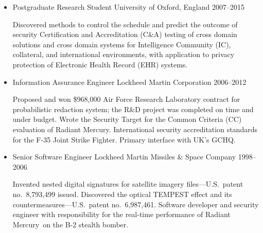 \vspace{3mm}
\begin{itemize}

    \vspace{-2mm}
	\item Postgraduate Research Student \hfill University of Oxford, England \hfill 2007--2015
        \vspace{-2mm}
		\begin{myquote}
            Discovered methods to control the schedule and predict the
            outcome of security Certification and Accreditation (C\&A)
            testing of cross domain solutions and cross domain systems for
            Intelligence Community (IC), collateral, and international
            environments, with application to privacy protection
            of Electronic Health Record (EHR) systems.
		\end{myquote}

    \vspace{-2mm}
	\item Information Assurance Engineer \hfill Lockheed Martin Corporation \hfill 2006--2012
		\vspace{-2mm}
		\begin{myquote}
            Proposed and won \$968,000 Air Force Research Laboratory
            contract for probabilistic redaction system; the R\&D
            project was completed on time and under budget. Wrote the
            Security Target for the Common Criteria (CC) evaluation of Radiant
            Mercury\rmtrademark. International security
            accreditation standards for the F-35 Joint Strike Fighter.
            Primary interface with UK's GCHQ.
		\end{myquote}

    \vspace{-2mm}
	\item Senior Software Engineer \hfill Lockheed Martin Missiles \& Space Company \hfill 1998--2006
		\vspace{-2mm}
		\begin{myquote}
            Invented nested digital signatures for satellite imagery
            files---U.S.\ patent no.~8,793,499 issued. Discovered the
            optical TEMPEST effect and its countermeasures---U.S.\ patent
            no.~6,987,461. Software developer and security engineer with
            responsibility for the real-time performance of Radiant
            Mercury\rmtrademark\ on the B-2 stealth bomber.
		\end{myquote}


\end{itemize}
